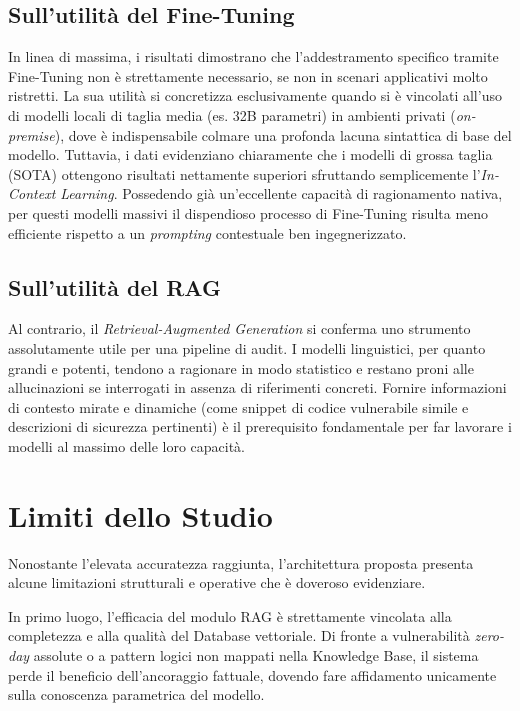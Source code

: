 \subsection{Sull'utilità del Fine-Tuning} 
In linea di massima, i risultati dimostrano che l'addestramento specifico tramite Fine-Tuning non è strettamente necessario, se non in scenari applicativi molto ristretti. La sua utilità si concretizza esclusivamente quando si è vincolati all'uso di modelli locali di taglia media (es. 32B parametri) in ambienti privati (\textit{on-premise}), dove è indispensabile colmare una profonda lacuna sintattica di base del modello. Tuttavia, i dati evidenziano chiaramente che i modelli di grossa taglia (SOTA) ottengono risultati nettamente superiori sfruttando semplicemente l'\textit{In-Context Learning}. Possedendo già un'eccellente capacità di ragionamento nativa, per questi modelli massivi il dispendioso processo di Fine-Tuning risulta meno efficiente rispetto a un \textit{prompting} contestuale ben ingegnerizzato.

\subsection{Sull'utilità del RAG} 
Al contrario, il \textit{Retrieval-Augmented Generation} si conferma uno strumento assolutamente utile per una pipeline di audit. I modelli linguistici, per quanto grandi e potenti, tendono a ragionare in modo statistico e restano proni alle allucinazioni se interrogati in assenza di riferimenti concreti. Fornire informazioni di contesto mirate e dinamiche (come snippet di codice vulnerabile simile e descrizioni di sicurezza pertinenti) è il prerequisito fondamentale per far lavorare i modelli al massimo delle loro capacità.

\section{Limiti dello Studio}
Nonostante l'elevata accuratezza raggiunta, l'architettura proposta presenta alcune limitazioni strutturali e operative che è doveroso evidenziare.

In primo luogo, l'efficacia del modulo RAG è strettamente vincolata alla completezza e alla qualità del Database vettoriale. Di fronte a vulnerabilità \textit{zero-day} assolute o a pattern logici non mappati nella Knowledge Base, il sistema perde il beneficio dell'ancoraggio fattuale, dovendo fare affidamento unicamente sulla conoscenza parametrica del modello.

